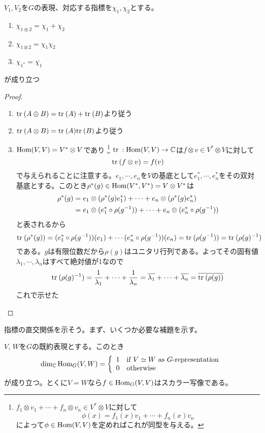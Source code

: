 \documentclass{ltjsarticle}
\begin{document}
\begin{prop}\label{char_property}
  $V_1,V_2$を$G$の表現、対応する指標を$\chi_1,\chi_2$とする。
  \begin{enumerate}
    \item $\chi_{1\oplus 2}=\chi_1+\chi_2$
    \item $\chi_{1\otimes 2}=\chi_1\chi_2$
    \item $\chi_{1^*}=\overline{\chi_1}$
  \end{enumerate}
  が成り立つ
\end{prop}

\begin{proof}
  \begin{enumerate}
    \item $\text{tr}\:(A\oplus B)=\text{tr}\:(A)+\text{tr}\:(B)$より従う
    \item $\text{tr}\:(A\otimes B)=\text{tr}\:(A)\text{tr}\:(B)$より従う
    \item $\text{Hom}(V,V)= V^*\otimes V$であり
    \footnote{$f_1\otimes v_1+\cdots+f_n\otimes v_n\in V^*\otimes V$に対して
    \[
    \phi(x)=f_1(x)v_1+\cdots+f_n(x)v_n
    \]
    によって$\phi\in\text{Hom}(V,V)$を定めればこれが同型を与える。
    }
    $\text{tr}\::\text{Hom}(V,V)\rightarrow \mathbb{C}$は$f\otimes v\in V^*\otimes V$に対して
    \[
    \text{tr}\:(f\otimes v)=f(v)
    \]
    で与えられることに注意する。$e_1,\cdots,e_n$を$V$の基底として$e_1^*,\cdots,e_n^*$をその双対基底とする。このとき$\rho^*(g)\in\text{Hom}(V^*,V^*)=V\otimes V^*$は
    \begin{align*}
    \rho^*(g)
    &=e_1\otimes(\rho^*(g)e_1^*)+\cdots+e_n\otimes(\rho^*(g)e_n^*)  \\
    &=e_1\otimes(e_1^*\circ\rho(g^{-1}))+\cdots+e_n\otimes(e_n^*\circ\rho(g^{-1}))
    \end{align*}
    と表されるから
    \[
    \text{tr}\:(\rho^*(g))=(e_1^*\circ\rho(g^{-1}))(e_1)+\cdots (e_n^*\circ\rho(g^{-1}))(e_n)=\text{tr}\:(\rho(g^{-1}))=\text{tr}\:(\rho(g)^{-1})
    \]
    である。$g$は有限位数だから$\rho(g)$はユニタリ行列である。よってその固有値$\lambda_1,\cdots,\lambda_n$はすべて絶対値が1なので
    \[
    \text{tr}\:(\rho(g)^{-1})=\frac{1}{\lambda_1}+\cdots+\frac{1}{\lambda_n}=\overline{\lambda_1}+\cdots+\overline{\lambda_n}=\overline{\text{tr}\:(\rho(g))}
    \]
    これで示せた
  \end{enumerate}
\end{proof}




指標の直交関係を示そう。まず、いくつか必要な補題を示す。
\begin{lemm}[Schurの補題]\label{schur_lem}
  $V$, $W$を$G$の既約表現とする。このとき
  \[
  \dim_{\mathbb{C}}\text{Hom}_G(V,W)=\left\{\begin{array}{cl}
    1 & \text{if $V\simeq W$ as $G$-representation}\\
    0 & \text{otherwise}
  \end{array}\right.
  \]
  が成り立つ。とくに$V=W$なら$f\in\text{Hom}_G(V,V)$はスカラー写像である。
\end{lemm}
\end{document}
